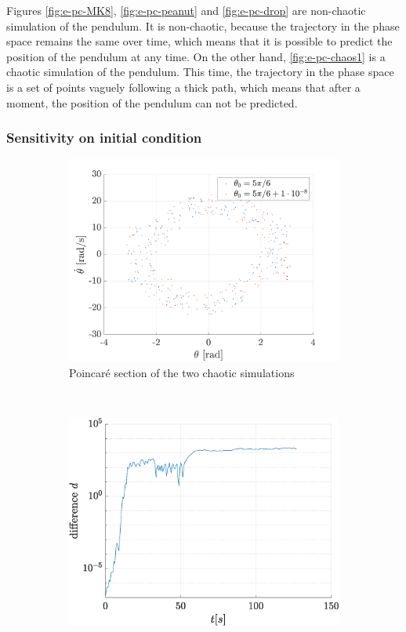 \documentclass[a4paper,12pt,twoside]{article}
\begin{document}
Figures \ref{fig:e-pc-MK8}, \ref{fig:e-pc-peanut} and \ref{fig:e-pc-drop} are non-chaotic simulation of the pendulum.
It is non-chaotic, because the trajectory in the phase space remains the same over time, which means that it is possible to predict the position of the pendulum at any time.
On the other hand, \ref{fig:e-pc-chaos1} is a chaotic simulation of the pendulum.
This time, the trajectory in the phase space is a set of points vaguely following a thick path, which means that after a moment, the position of the pendulum can not be predicted.

\subsubsection{Sensitivity on initial condition}

\begin{figure}[h]
\centering
	\begin{subfigure}[t]{0.47\textwidth}
		\includegraphics[width=\textwidth]{graphs/e_sens_chaos.png}
		\caption{Poincaré section of the two chaotic simulations}
		\label{fig:e-sens-chaos}
	\end{subfigure}
	~
	\begin{subfigure}[t]{0.45\textwidth}
		\includegraphics[width=\textwidth]{graphs/e_lyap_chaos.eps}

\end{subfigure}
\end{figure}
\end{document}
